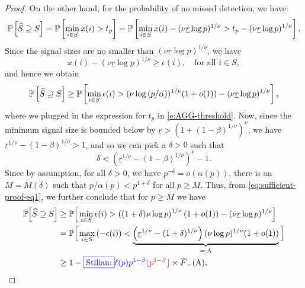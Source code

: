 \begin{proof}
On the other hand, for the probability of no missed detection, we have:
\begin{equation*}
    \P\left[\widehat{S} \supseteq S\right] 
        = \P\left[\min_{i\in S}x(i) > t_p\right]
        = \P\left[\min_{i\in S}x(i) - (\nu\underline{r}\log p)^{1/\nu} > t_p - (\nu\underline{r}\log p)^{1/\nu} \right].
\end{equation*}
Since the signal sizes are no smaller than $(\nu\underline{r}\log p)^{1/\nu}$, we have
\begin{equation*}
    x(i) - \left(\nu\underline{r}\log{p}\right)^{1/\nu} \ge \epsilon(i), \quad \text{for all }i\in S,
\end{equation*}
and hence we obtain
\begin{equation} \label{eq:sufficient-proof-eq1}
    \P\left[\widehat{S} \supseteq S\right] \ge 
    \P\left[\min_{i\in S}\epsilon(i) > (\nu\log{(p/\alpha)})^{1/\nu}(1+o(1)) - (\nu\underline{r}\log p)^{1/\nu} \right],
\end{equation}
where we plugged in the expression for $t_p$ in \eqref{e:AGG-threshold}.
Now, since the minimum signal size is bounded below by $\underline{r} > \left(1 + (1-\beta)^{1/\nu}\right)^\nu$, we have $\underline{r}^{1/\nu}-(1-\beta)^{1/\nu}>1$, and so we can pick a $\delta > 0$ such that 
\begin{equation} \label{eq:choice-of-delta}
    \delta < \left(\underline{r}^{1/\nu} - (1-\beta)^{1/\nu}\right)^\nu - 1.
\end{equation}
Since by assumption, for all $\delta>0$, we have $p^{-\delta} = o\left(\alpha(p)\right)$, there is an
$M=M(\delta)$ such that $p/\alpha(p) < p^{1+\delta}$ for all $p\ge M$. Thus, from \eqref{eq:sufficient-proof-eq1}, we further conclude that for $p\ge M$ we have
\begin{align}
    \P\Big[\widehat{S} \supseteq S\Big]
      &\ge \P\Big[\min_{i\in S}\epsilon(i) > \left((1+\delta)\nu\log{p}\right)^{1/\nu}(1+o(1)) - (\nu\underline{r}\log p)^{1/\nu} \Big] \nonumber \\
      &= \P\Big[\max_{i\in S}\left(-\epsilon(i)\right) < \underbrace{\left(\underline{r}^{1/\nu} - (1+\delta)^{1/\nu}\right)(\nu\log{p})^{1/\nu}(1+o(1))}_{=:\text{A}} \Big] \nonumber \\
      &\ge 1 - \stilian{\ell(p)p^{1-\beta}}{\lfloor p^{1-\beta} \rfloor} \times \overline{F}_-(\text{A}), \label{eq:sufficient-proof-eq2}
\end{align}

\end{proof}
